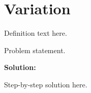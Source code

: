 \section{Variation}


\begin{definition}[Term]
Definition text here.
\end{definition}

\begin{example}
Problem statement.

\textbf{Solution:}

Step-by-step solution here.
\end{example}
